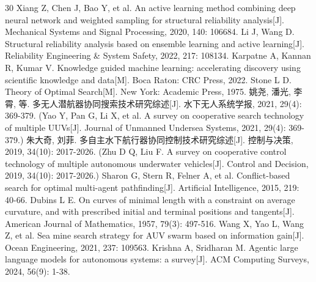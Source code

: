 \documentclass[a4paper,UTF8,zihao=5,twocolumn]{ctexart}
\numberwithin{equation}{section}
\begin{document}
\begin{thebibliography}{30}
 Xiang Z, Chen J, Bao Y, et al. An active learning method combining deep neural network and weighted sampling for structural reliability analysis[J]. Mechanical Systems and Signal Processing, 2020, 140: 106684.
 Li J, Wang D. Structural reliability analysis based on ensemble learning and active learning[J]. Reliability Engineering \& System Safety, 2022, 217: 108134.
 Karpatne A, Kannan R, Kumar V. Knowledge guided machine learning: accelerating discovery using scientific knowledge and data[M]. Boca Raton: CRC Press, 2022.
 Stone L D. Theory of Optimal Search[M]. New York: Academic Press, 1975.
 姚尧, 潘光, 李霄, 等. 多无人潜航器协同搜索技术研究综述[J]. 水下无人系统学报, 2021, 29(4): 369-379. (Yao Y, Pan G, Li X, et al. A survey on cooperative search technology of multiple UUVs[J]. Journal of Unmanned Undersea Systems, 2021, 29(4): 369-379.)
 朱大奇, 刘菲. 多自主水下航行器协同控制技术研究综述[J]. 控制与决策, 2019, 34(10): 2017-2026. (Zhu D Q, Liu F. A survey on cooperative control technology of multiple autonomous underwater vehicles[J]. Control and Decision, 2019, 34(10): 2017-2026.)
 Sharon G, Stern R, Felner A, et al. Conflict-based search for optimal multi-agent pathfinding[J]. Artificial Intelligence, 2015, 219: 40-66.
 Dubins L E. On curves of minimal length with a constraint on average curvature, and with prescribed initial and terminal positions and tangents[J]. American Journal of Mathematics, 1957, 79(3): 497-516.
 Wang X, Yao L, Wang Z, et al. Sea mine search strategy for AUV swarm based on information gain[J]. Ocean Engineering, 2021, 237: 109563.
 Krishna A, Sridharan M. Agentic large language models for autonomous systems: a survey[J]. ACM Computing Surveys, 2024, 56(9): 1-38.

\end{thebibliography}
\end{document}
